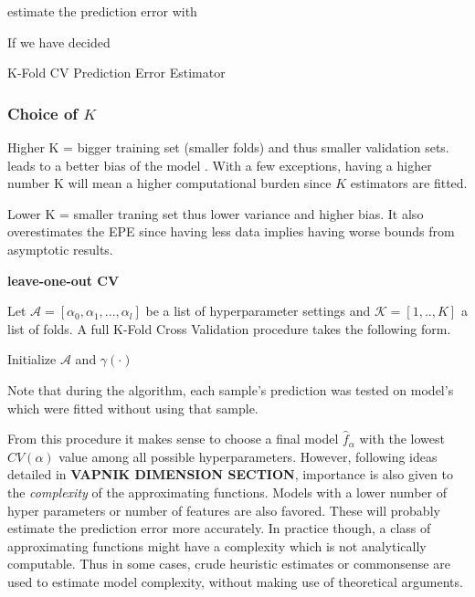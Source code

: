  
 estimate the prediction error with
 
 
 
 If we have decided 
 
 
 
 \begin{definition}{K-Fold CV Prediction Error Estimator}
 	
 \end{definition}
 
 \subsubsection{Choice of $K$} 
 
 Higher K = bigger training set (smaller folds) and thus smaller validation sets. leads to a better bias of the model . With a few exceptions, having a higher number K will mean a higher computational burden since $K$ estimators are fitted. 
 
 Lower K = smaller traning set thus lower variance and higher bias. It also overestimates the EPE since having less data implies having worse bounds from asymptotic results. 
 
\textbf{leave-one-out CV}
 
 Let $\mathcal{A} = [\alpha_0, \alpha_1,..., \alpha_l   ]$ be a list of hyperparameter settings and  $\mathcal{K} =[1,..,K]$ a list of folds.  A full K-Fold Cross Validation procedure takes the following form.
 
 \begin{algorithm}%
 	\SetAlgoLined
 	Initialize $\mathcal{A}$ and $\gamma(\cdot)$\;
 \caption{K-Fold Cross Validation Estimation Procedure}
\end{algorithm}

Note that during the algorithm, each sample's prediction was tested on model's which were fitted without using that sample. 

From this procedure it makes sense to choose a final  model $\hat{f}_\alpha$ with the lowest $CV(\alpha)$ value among all possible hyperparameters. However, following ideas detailed in \textbf{VAPNIK DIMENSION SECTION}, importance is also given to the \textit{complexity} of the approximating functions. Models with a lower number of hyper parameters or number of features are also favored. These will probably estimate the prediction error more accurately. In practice though, a class of approximating functions might have a complexity which is not analytically computable. Thus in some cases, crude heuristic estimates or commonsense are used to estimate model complexity, without making use of theoretical arguments.

